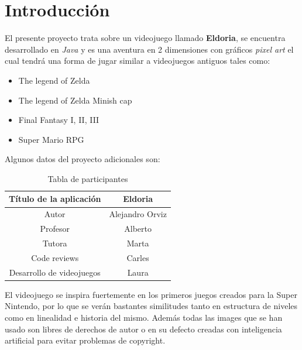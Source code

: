 \documentclass[a4paper]{article}
\begin{document}
\section{Introducción}
El presente proyecto trata sobre un videojuego llamado \textbf{Eldoria}, se encuentra desarrollado en \textit{Java} y es una aventura en 2 dimensiones con gráficos \textit{pixel art}
el cual tendrá una forma de jugar similar a videojuegos antiguos tales como:
\begin{itemize}
    \item The legend of Zelda
    \item The legend of Zelda Minish cap
    \item Final Fantasy I, II, III
    \item Super Mario RPG
\end{itemize}
Algunos datos del proyecto adicionales son:

\begin{table}[ht]
    \centering
    \begin{tabular}{| c | c |}
        \hline
        Título de la aplicación   & Eldoria         \\ \hline
        Autor                     & Alejandro Orviz \\ \hline
        Profesor                  & Alberto         \\ \hline
        Tutora                    & Marta           \\ \hline
        Code reviews              & Carles          \\ \hline
        Desarrollo de videojuegos & Laura           \\ \hline
    \end{tabular}
    \caption{Tabla de participantes}
    \label{tab:participantes}
\end{table}

El videojuego se inspira fuertemente en los primeros juegos creados para la Super Nintendo, por lo que se verán bastantes similitudes tanto en estructura de niveles
como en linealidad e historia del mismo. Además todas las images que se han usado son libres de derechos de autor o en su defecto creadas con inteligencia artificial para evitar problemas de copyright.

\clearpage
\end{document}
